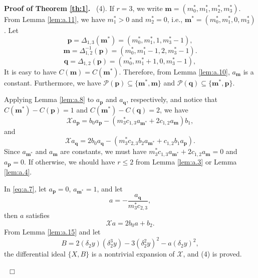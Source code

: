 \documentclass[preprint,12pt]{elsarticle}
\newenvironment{proof}[1][Proof]{\textbf{#1.}\ }{\ $\Box$}
\begin{document}
\begin{proof}[Proof of Theorem \ref{th:1}]
(4). If $r = 3$, we write $\mathbf{m} = (m_0^*, m_1^*, m_2^*, m_3^*)$. From Lemma
\ref{lem:a.11}, we have $m_1^*>0$ and $m_2^* = 0$, i.e., $\mathbf{m}^* = (m_0^*, m_1^*, 0, m_3^*)$. Let
$$\mathbf{p} = \Delta_{1,3}(\mathbf{m}^*) = (m_0^*, m_1^*, 1, m_3^*-1),$$
$$ \mathbf{m} = {\Delta_{1,2}^{-1}}(\mathbf{p}) = (m_0^*, m_1^*-1,2, m_3^*-1).$$ 
$$ \mathbf{q} = \Delta_{1,2}(\mathbf{p}) = (m_0^*, m_1^*+1,0,m_3^*-1),$$
It is easy to have
$C(\mathbf{m}) = C(\mathbf{m}^*)$. Therefore, from Lemma
\ref{lem:a.10}, $a_{\mathbf{m}}$ is a constant. Furthermore, we have 
$\mathcal{P}(\mathbf{p}) \subseteq \{\mathbf{m}^*,\mathbf{m}\}$ and
$\mathcal{P}(\mathbf{q}) \subseteq \{\mathbf{m}^*,\mathbf{p}\}$.  

Applying Lemma \ref{lem:a.8} to $a_{\mathbf{p}}$ and $a_{\mathbf{q}}$, respectively, and notice that $C(\mathbf{m}^*) - C(\mathbf{p}) =1 $ and $C(\mathbf{m}^*) - C(\mathbf{q}) = 2$, we have
\begin{equation}
\label{eq:a.6} 
\mathscr{X}a_{\mathbf{p}} = b_0 a_{\mathbf{p}} -
(m_3^* c_{1,3} a_{\mathbf{m}^*} + 2 c_{1, 2} a_{\mathbf{m}}) b_1,
\end{equation}
and
\begin{equation}
\label{eq:a.7} 
\mathscr{X}a_{\mathbf{q}} = 2 b_0 a_{\mathbf{q}} -
(m_3^*  c_{2,3}  b_2 a_{\mathbf{m}^*} + c_{1,2} b_1 a_{\mathbf{p}}).
\end{equation}
Since $a_{\mathbf{m}^*}$ and $a_\mathbf{m}$ are constants, we must have   
$m_3^* c_{1,3} a_{\mathbf{m}^*} + 2 c_{1,2}  a_{\mathbf{m}} = 0$
and $a_{\mathbf{p}} = 0$. If otherwise, we should have $r \leq 2$ from Lemma \ref{lem:a.3} or Lemma \ref{lem:a.4}.  

In \eqref{eq:a.7}, let $a_{\mathbf{p}} = 0$, $a_{\mathbf{m}^*}= 1$, and let
$$a = -\dfrac{a_{\mathbf{q}}}{m_3^* c_{2,3}},$$
then $a$ satisfies
$$\mathscr{X} a = 2 b_0 a + b_2.$$
From Lemma \ref{lem:a.15} and let
$$B = 2 (\delta_2y)(\delta_2^3 y) - 3 (\delta_2^2 y)^2 - a (\delta_2 y)^2,$$
the differential ideal $\{X, B\}$ is a nontrivial expansion of $\mathscr{X}$, and (4) is proved.


\end{proof}
\end{document}
